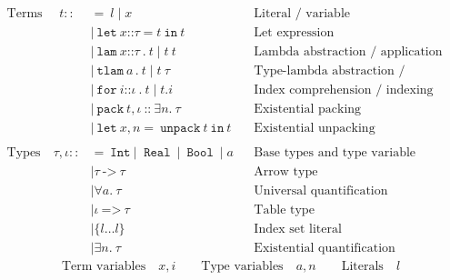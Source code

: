 \documentclass[12pt]{article}
\newcommand{\annot}[1]{\texttt{::} #1}
\newcommand{\ttt}[1]{~\texttt{#1}~}
\begin{document}
\vspace{-0.5cm}

\begin{huge}
\begin{align*}
\text{Terms } \quad t ::&=~
l  \mid x
      && \text{Literal / variable} \\
&\mid \ttt{let} x \annot{\tau} = t \ttt{in} t
        && \text{Let expression} \\
&\mid \ttt{lam} x \annot{\tau} \ttt {.} t
   \mid  t ~ t
    && \text{Lambda abstraction / application} \\
&\mid \ttt{tlam} a \, . ~ t
   \mid t ~ \tau
    && \text{Type-lambda abstraction / application} \\
&\mid \ttt{for} i \annot{\iota}  \ttt {.} t
   \mid t.i
    && \text{Index comprehension / indexing} \\
&\mid \ttt{pack} t, \iota \ttt{::} \exists n. ~ \tau
       && \text{Existential packing} \\
&\mid \ttt{let} x, n = \ttt{unpack} t \ttt{in} t
       && \text{Existential unpacking}
\\ \\
\text{Types} \quad \tau, \iota ::&=
 \ttt{Int} | \ttt{ Real} \mid \ttt{Bool} \mid a
      && \text{Base types and type variable} \\
&\mid \tau   \ttt{->} \tau  && \text{Arrow type} \\
&\mid \forall a. ~ \tau
    && \text{Universal quantification} \\
&\mid \iota \ttt{=>} \tau  && \text{Table type} \\
&\mid \{l\ldots l\}  && \text{Index set literal} \\
&\mid \exists n. ~ \tau
    && \text{Existential quantification}
\end{align*}
%
\begin{align*}
\text{Term variables} \quad x, i \qquad
\text{Type variables} \quad a, n \qquad
\text{Literals} \quad l
\end{align*}
\end{huge}
\end{document}
